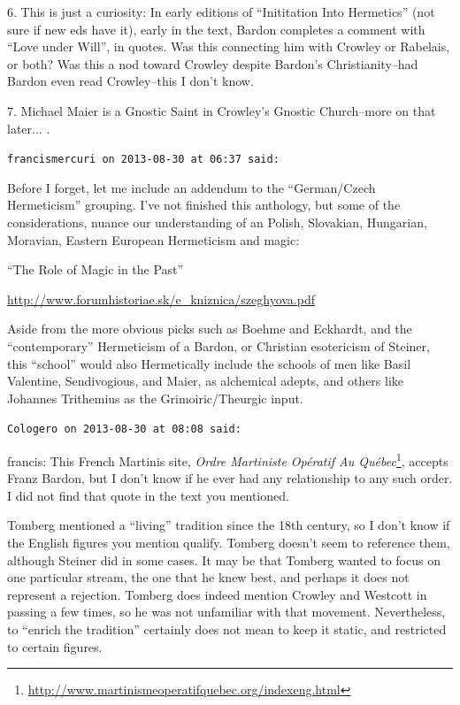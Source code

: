 \begin{footnotesize}
\begin{sffamily}
6. This is just a curiosity: In early editions of ``Inititation Into Hermetics'' (not sure if new eds have it), early in the text, Bardon completes a comment with ``Love under Will'', in quotes. Was this connecting him with Crowley or Rabelais, or both? Was this a nod toward Crowley despite Bardon's Christianity--had Bardon even read Crowley--this I don't know.

7. Michael Maier is a Gnostic Saint in Crowley's Gnostic Church--more on that later... .

\hfill

\texttt{francismercuri on 2013-08-30 at 06:37 said:}

Before I forget, let me include an addendum to the ``German/Czech Hermeticism'' grouping. I've not finished this anthology, but some of the considerations, nuance our understanding of an Polish, Slovakian, Hungarian, Moravian, Eastern European Hermeticism and magic:

``The Role of Magic in the Past''

\url{http://www.forumhistoriae.sk/e\_kniznica/szeghyova.pdf}


Aside from the more obvious picks such as Boehme and Eckhardt, and the ``contemporary'' Hermeticism of a Bardon, or Christian esotericism of Steiner, this ``school'' would also Hermetically include the schools of men like Basil Valentine, Sendivogious, and Maier, as alchemical adepts, and others like Johannes Trithemius as the Grimoiric/Theurgic input.

\hfill

\texttt{Cologero on 2013-08-30 at 08:08 said:}

francis: This French Martinis site, \textit{Ordre Martiniste Opératif Au Québec}\footnote{\url{http://www.martinismeoperatifquebec.org/indexeng.html}}, accepts Franz Bardon, but I don't know if he ever had any relationship to any such order. I did not find that quote in the text you mentioned.

Tomberg mentioned a ``living'' tradition since the 18th century, so I don't know if the English figures you mention qualify. Tomberg doesn't seem to reference them, although Steiner did in some cases. It may be that Tomberg wanted to focus on one particular stream, the one that he knew best, and perhaps it does not represent a rejection. Tomberg does indeed mention Crowley and Westcott in passing a few times, so he was not unfamiliar with that movement. Nevertheless, to ``enrich the tradition'' certainly does not mean to keep it static, and restricted to certain figures.


\end{sffamily}
\end{footnotesize}
